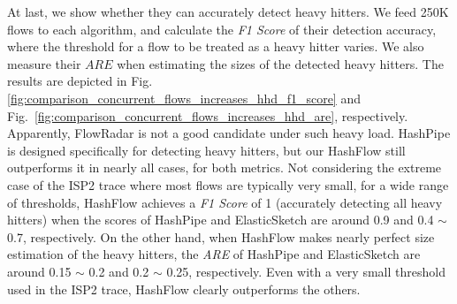 At last, we show whether they can accurately detect heavy hitters.
We feed 250K flows to each algorithm, and calculate the \emph{F1 Score} of their detection accuracy, 
where the threshold for a flow to be treated as a heavy hitter varies. 
We also measure their $ARE$ when estimating the sizes of the detected heavy hitters.
The results are depicted in Fig. \ref{fig:comparison_concurrent_flows_increases_hhd_f1_score} 
and Fig.~\ref{fig:comparison_concurrent_flows_increases_hhd_are}, respectively. 
Apparently, FlowRadar is not a good candidate under such heavy load. 
HashPipe is designed specifically for detecting heavy hitters, 
but our HashFlow still outperforms it in nearly all cases, for both metrics. 
Not considering the extreme case of the ISP2 trace where most flows are typically very small, 
for a wide range of thresholds, HashFlow achieves a \emph{F1 Score} of 1 (accurately detecting all heavy hitters) 
when the scores of HashPipe and ElasticSketch are around 0.9 and 0.4 $\sim$ 0.7, respectively. 
On the other hand, when HashFlow makes nearly perfect size estimation of the heavy hitters, 
the \emph{ARE} of HashPipe and ElasticSketch are around 0.15 $\sim$ 0.2 and 0.2 $\sim$ 0.25, respectively.
Even with a very small threshold used in the ISP2 trace, HashFlow clearly outperforms the others.

